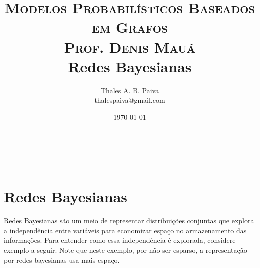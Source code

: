 \documentclass[paper=a4, fontsize=11pt]{scrartcl} %
\title{	
\normalfont \normalsize 
\textsc{Modelos Probabilísticos Baseados em Grafos} \\ 
\textsc{Prof. Denis Mauá} \\ [25pt]
\huge Redes Bayesianas \\ [25pt]
}
\author{Thales A. B. Paiva \\ thalespaiva@gmail.com} %
\date{\today} %
\numberwithin{equation}{subsection}
\numberwithin{figure}{subsection}
\numberwithin{table}{subsection}
\numberwithin{definition}{subsection}
\numberwithin{theorem}{subsection}
\numberwithin{property}{subsection}
\numberwithin{proposition}{subsection}
\numberwithin{equation}{section}
\numberwithin{figure}{section}
\numberwithin{table}{section}
\numberwithin{definition}{section}
\numberwithin{theorem}{section}
\numberwithin{property}{section}
\numberwithin{proposition}{section}
\newcommand{\horrule}[1]{\rule{\linewidth}{#1}} %
\begin{document}
\maketitle %
\horrule{1pt} \\[0.5cm] %

\tableofcontents



\pagebreak
\section{Redes Bayesianas}

Redes Bayesianas são um meio de representar distribuições conjuntas que explora a independência entre variáveis para economizar espaço no armazenamento das informações. Para entender como essa independência é explorada, considere exemplo a seguir. Note que neste exemplo, por não ser esparso, a representação por redes bayesianas usa mais espaço.
\end{document}

